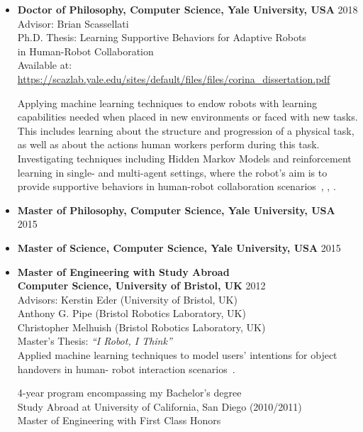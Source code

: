 \documentclass[10pt,letterpaper]{article}
\newcommand{\thing}[2]{{#1} \hfill {#2}}
\begin{document}
\begin{itemize}%
\item \thing{\bf Doctor of Philosophy, Computer Science, Yale University, USA}{2018}\\
	Advisor: Brian Scassellati\\
	Ph.D. Thesis: Learning Supportive Behaviors for Adaptive Robots \\
	\hphantom{Area of study:} in Human-Robot Collaboration \\
	Available at: \href{https://scazlab.yale.edu/sites/default/files/files/corina_dissertation.pdf}{\url{https://scazlab.yale.edu/sites/default/files/files/corina_dissertation.pdf}}
	
	Applying machine learning techniques to endow robots with learning capabilities needed when placed in new environments or faced with new tasks. This includes learning about the structure and progression of a physical task, as well as about the actions human workers perform during this task. Investigating techniques including Hidden Markov Models and reinforcement learning in single- and multi-agent settings, where the robot's aim is to provide supportive behaviors in human-robot collaboration scenarios~\cite{grigore2018pref_assistance}, \cite{grigore2017granularity}, \cite{grigore2016hmarl}.

\item \thing{\bf Master of Philosophy, Computer Science, Yale University, USA}{2015}
\item \thing{\bf Master of Science, Computer Science, Yale University, USA}{2015}
\item \thing{\bf Master of Engineering with Study Abroad\\Computer Science, University of Bristol, UK}{2012}\\
	Advisors: Kerstin Eder (University of Bristol, UK)\\
	\hphantom{Advisors:} Anthony G. Pipe (Bristol Robotics Laboratory, UK)\\
	\hphantom{Advisors:} Christopher Melhuish (Bristol Robotics Laboratory, UK)\\
	Master's Thesis: {\it ``I Robot, I Think''}\\
	Applied machine learning techniques to model users' intentions for object handovers in human-
robot interaction scenarios~\cite{grigore2013joint}.

	4-year program encompassing my Bachelor's degree\\
	Study Abroad at University of California, San Diego (2010/2011)\\
	Master of Engineering with First Class Honors


\end{itemize}
\end{document}
